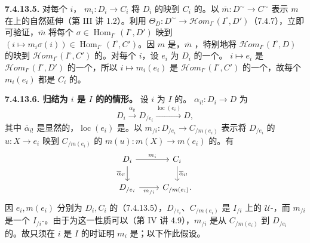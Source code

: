 \textbf{7.4.13.5.} 对每个 $i$， $m_i:D_i\to C_i$ 将 $D_i$ 的映到 $C_i$ 的。以 $\overline m:D^\sim\to C^\sim$ 表示 $m$ 在上的自然延伸（第 III 讲 1.2）。利用 $\Theta_D:D^\sim\to\mathscr{H}\!om_{I^\circ}(I^\circ,D')$（7.4.7），立即可验证，$\overline m$ 将每个 $\sigma\in\operatorname{Hom}_{I^\circ}(I^\circ,D')$ 映到 $(i\mapsto m_i\sigma(i))\in\operatorname{Hom}_{I^\circ}(I^\circ,C')$。因 $m$ 是，$\overline m$ ，特别地将 $\mathscr{H}\!om_{I^\circ}(I^\circ,D)$ 的映到 $\mathscr{H}\!om_{I^\circ}(I^\circ,C')$ 的。对每个 $i$，设 $e_i$ 为 $D_i$ 的一个。 $i\mapsto e_i$ 是 $\mathscr{H}\!om_{I^\circ}(I^\circ,D')$ 的一个，所以 $i\mapsto m_i(e_i)$ 是 $\mathscr{H}\!om_{I^\circ}(I^\circ,C')$ 的一个，故每个 $m_i(e_i)$ 都是 $C_i$ 的。

\textbf{7.4.13.6. 归结为 $i$ 是 $I$ 的的情形。} 设 $i$ 为 $I$ 的。 $\alpha_{i!}:D_i\to D$ 为
\[D_i\xrightarrow{\overline\alpha_{i!}}D_{/e_i}\xrightarrow{\operatorname{loc}(e_i)}D,\]
其中 $\overline\alpha_{i!}$ 是显然的，$\operatorname{loc}(e_i)$ 是。以 $m_{/i}:D_{/e_i}\to C_{/m(e_i)}$ 表示将 $D_{/e_i}$ 的 $u:X\to e_i$ 映到 $C_{/m(e_i)}$ 的 $m(u):m(X)\to m(e_i)$ 的。有
\[\begin{tikzcd}
D_i\arrow[r,"m_i"]\arrow[d,"\overline\alpha_{i!}"']&C_i\arrow[d,"\overline\alpha_{i!}"]\\
D_{/e_i}\arrow[r,"m_{/i}"']&C_{/m(e_i)}.
\end{tikzcd}\]
因 $e_i,m(e_i)$ 分别为 $D_i,C_i$ 的（7.4.13.5），$D_{/e_i}$、$C_{/m(e_i)}$ 是 $I_{/i}$ 上的 $\mathcal U$-，而 $m_{/i}$ 是一个 $I_{/i}$-。由于为这一性质可以（第 IV 讲 4.9），$m_{/i}$ 是从 $C_{/m(e_i)}$ 到
$D_{/e_i}$ 的。故只须在 $i$ 是 $I$ 的时证明 $m_i$ 是；以下作此假设。

